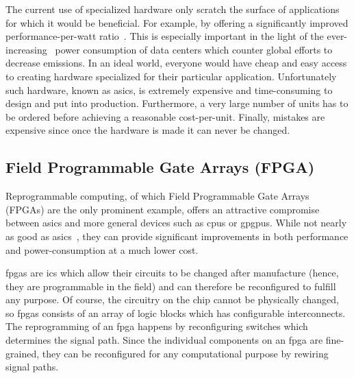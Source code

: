 The current use of specialized hardware only scratch the surface of applications
for which it would be beneficial. For example, by offering a significantly
improved performance-per-watt ratio~\cite{fowers2012performance}. This is
especially important in the light of the
ever-increasing~\cite{avgerinou2017trends} power consumption of data centers
which counter global efforts to decrease emissions. In an ideal world, everyone
would have cheap and easy access to creating hardware specialized for their
particular application. Unfortunately such hardware, known as \glspl{asic}, is
extremely expensive and time-consuming to design and put into
production. Furthermore, a very large number of units has to be ordered before
achieving a reasonable cost-per-unit. Finally, mistakes are expensive since once
the hardware is made it can never be changed.




\subsection{Field Programmable Gate Arrays (FPGA)}
Reprogrammable computing, of which Field Programmable Gate Arrays (FPGAs) are
the only prominent example, offers an attractive compromise between \glspl{asic} and
more general devices such as \glspl{cpu} or \glspl{gpgpu}. While not nearly as good as
\glspl{asic}~\cite{kuon2007measuring}, they can provide significant improvements in
both performance and power-consumption at a much lower cost.

\glspl{fpga} are \glspl{ic} which allow their circuits to be changed after
manufacture (hence, they are programmable in the field) and can therefore be
reconfigured to fulfill any purpose. Of course, the circuitry on the chip cannot
be physically changed, so \glspl{fpga} consists of an array of logic blocks
which has configurable interconnects. The reprogramming of an \gls{fpga} happens
by reconfiguring switches which determines the signal path. Since the individual
components on an \gls{fpga} are fine-grained, they can be reconfigured for any
computational purpose by rewiring signal paths.

